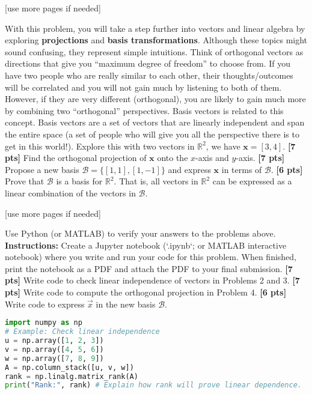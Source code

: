 \documentclass{ee102_pset}
\begin{document}
\vspace*{\fill}
\begin{center}
[use more pages if needed]
\end{center}




 With this problem, you will take a step further into vectors and linear algebra by exploring \textbf{projections} and \textbf{basis transformations}. Although these topics might sound confusing, they represent simple intuitions. Think of orthogonal vectors as directions that give you ``maximum degree of freedom'' to choose from. If you have two people who are really similar to each other, their thoughts/outcomes will be correlated and you will not gain much by listening to both of them. However, if they are very different (orthogonal), you are likely to gain much more by combining two ``orthogonal'' perspectives. Basis vectors is related to this concept. Basis vectors are a set of vectors that are linearly independent and span the entire space (a set of people who will give you all the perspective there is to get in this world!). Explore this with two vectors in $\mathbb{R}^2$, we have $\textbf{x} = [3, 4]$.
\problempart \textbf{[7 pts]} Find the orthogonal projection of $\textbf{x}$ onto the $x$-axis and $y$-axis.
\problempart \textbf{[7 pts]} Propose a new basis $\mathcal{B} = \{[1, 1], [1, -1]\}$ and express $\textbf{x}$ in terms of $\mathcal{B}$.
\problempart \textbf{[6 pts]} Prove that $\mathcal{B}$ is a basis for $\mathbb{R}^2$. That is, all vectors in $\mathbb{R}^2$ can be expressed as a linear combination of the vectors in $\mathcal{B}$.

\vspace*{\fill}
\begin{center}
[use more pages if needed]
\end{center}



Use Python (or MATLAB) to verify your answers to the problems above.
\\ \textbf{Instructions:} Create a Jupyter notebook (`.ipynb`; or MATLAB interactive notebook) where you write and run your code for this problem. When finished, print the notebook as a PDF and attach the PDF to your final submission.
\problempart \textbf{[7 pts]} Write code to check linear independence of vectors in Problems 2 and 3.
\problempart \textbf{[7 pts]} Write code to compute the orthogonal projection in Problem 4.
\problempart \textbf{[6 pts]} Write code to express $\vec{x}$ in the new basis $\mathcal{B}$.

\begin{lstlisting}[language=Python, caption=Starter code for Problem 5]
import numpy as np
# Example: Check linear independence
u = np.array([1, 2, 3])
v = np.array([4, 5, 6])
w = np.array([7, 8, 9])
A = np.column_stack([u, v, w])
rank = np.linalg.matrix_rank(A)
print("Rank:", rank) # Explain how rank will prove linear dependence.
\end{lstlisting}
\end{document}
